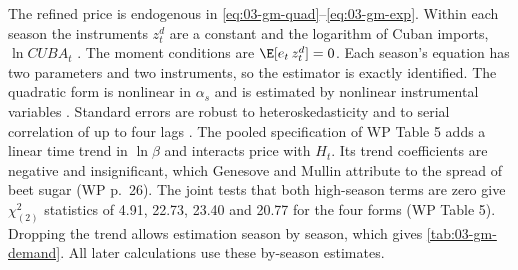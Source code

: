 The refined price is endogenous in \eqref{eq:03-gm-quad}--\eqref{eq:03-gm-exp}. Within each season the
instruments $z^d_t$ are a constant and the logarithm of Cuban imports, $\ln\mathit{CUBA}_t$
\citep[Table~3, notes]{GenesoveMullin1998}. The moment conditions are $\E[e_t\, z^d_t] = 0$.
Each season's equation has two parameters and two instruments, so the estimator is exactly identified. The quadratic form is nonlinear in $\alpha_s$ and is
estimated by nonlinear instrumental variables \citep{Amemiya1985}. Standard errors are robust to
heteroskedasticity and to serial correlation of up to four lags \citep{NeweyWest1987}. The pooled
specification of WP Table 5 adds a linear time trend in $\ln\beta$ and interacts price with $H_t$. Its trend
coefficients are negative and insignificant, which Genesove and Mullin attribute to the spread of beet sugar
(WP p.~26). The joint tests that both high-season terms are zero give $\chi^2_{(2)}$ statistics of 4.91,
22.73, 23.40 and 20.77 for the four forms (WP Table 5). Dropping the trend allows estimation season by season, which gives \cref{tab:03-gm-demand}. All
later calculations use these by-season estimates.

